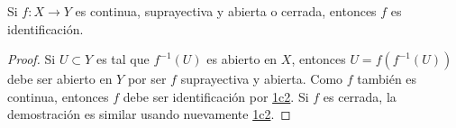 

\begin{proposition}
Si $f : X \longrightarrow Y$ es continua, suprayectiva y abierta o cerrada, entonces $f$ es identificación.
\end{proposition}

\begin{proof}
Si $U \subset Y$ es tal que $f^{-1}(U)$ es abierto en $X$, entonces $U = f(f^{-1}(U))$ debe ser abierto en $Y$ por ser $f$ suprayectiva y abierta. Como $f$ también es continua, entonces $f$ debe ser identificación por \hyperref[card:1c2]{\textsf{1c2}}. Si $f$ es cerrada, la demostración es similar usando nuevamente \hyperref[card:1c2]{\textsf{1c2}}.

\end{proof}
